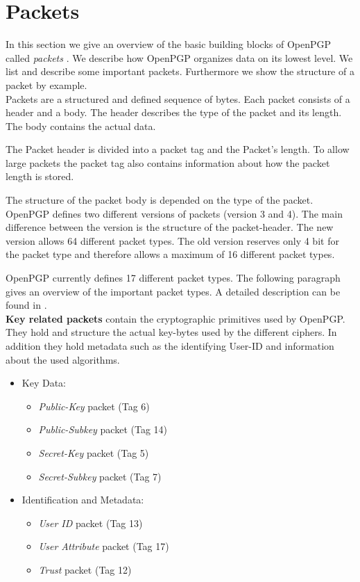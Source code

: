 \section{Packets}
\label{section:messageformat:packets}

In this section we give an overview of the basic building blocks of OpenPGP called \textit{packets} \cite[section 5]{RFC4880}. We describe how OpenPGP organizes data on its lowest level. We list and describe some important packets. Furthermore we show the structure of a packet by example.  \\


Packets are a structured and defined sequence of bytes.  Each packet consists of a header and a body. The header describes the type of the packet and its length. The body contains the actual data.

The Packet header is divided into a packet tag and the Packet's length. To allow large packets the packet tag also contains information about how the packet length is stored. 

The structure of the packet body is depended on the type of the packet. \\


OpenPGP defines two different versions of packets (version 3 and 4). The main difference between the version is the structure of the packet-header. The new version allows 64 different packet types. The old version reserves only 4 bit for the packet type and therefore allows a maximum of 16 different packet types.

OpenPGP currently defines 17 different packet types. The following paragraph gives an overview of the important packet types. A detailed description can be found in \cite[section 5]{RFC4880}. \\ 


\textbf{Key related packets} contain the cryptographic primitives used by OpenPGP. They hold and structure the actual key-bytes used by the different ciphers. In addition they hold metadata such as the identifying User-ID and information about the used algorithms.

\begin{itemize}
	\item Key Data:
	\begin{itemize}
		\item \textit{Public-Key} packet (Tag 6)
		\item \textit{Public-Subkey} packet (Tag 14)
		\item \textit{Secret-Key} packet (Tag 5)
		\item \textit{Secret-Subkey} packet (Tag 7)
	\end{itemize}
	\item Identification and Metadata:
	\begin{itemize}
		\item \textit{User ID} packet (Tag 13)
		\item \textit{User Attribute} packet (Tag 17)
		\item \textit{Trust} packet (Tag 12)
	\end{itemize}
\end{itemize}

